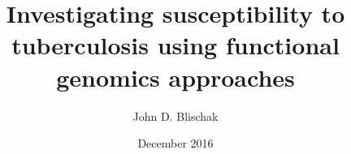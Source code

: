 \documentclass{ucetd}
\title{Investigating susceptibility to tuberculosis using functional genomics approaches}
\author{John D. Blischak}
\date{December 2016}
\begin{document}
\maketitle

\makecopyright


\tableofcontents
\listoffigures
\listoftables

\acknowledgments



\mainmatter











\makebibliography

%
%
\end{document}

